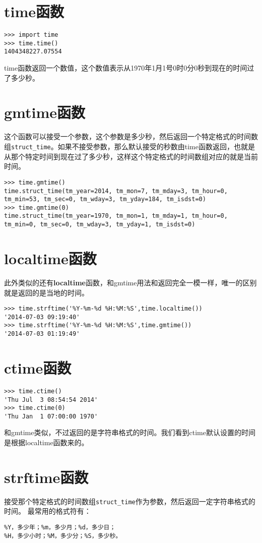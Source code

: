 \documentclass[12pt,oneside]{book}
\begin{document}
\begin{common-format}
\section{time函数}
\begin{Verbatim}
>>> import time
>>> time.time()
1404348227.07554
\end{Verbatim}
time函数返回一个数值，这个数值表示从1970年1月1号0时0分0秒到现在的时间过了多少秒。

\section{gmtime函数}
这个函数可以接受一个参数，这个参数是多少秒，然后返回一个特定格式的时间数组\verb+struct_time+。如果不接受参数，那么默认接受的秒数由time函数返回，也就是从那个特定时间到现在过了多少秒，这样这个特定格式的时间数组对应的就是当前时间。

\begin{Verbatim}
>>> time.gmtime()
time.struct_time(tm_year=2014, tm_mon=7, tm_mday=3, tm_hour=0, 
tm_min=53, tm_sec=0, tm_wday=3, tm_yday=184, tm_isdst=0)
>>> time.gmtime(0)
time.struct_time(tm_year=1970, tm_mon=1, tm_mday=1, tm_hour=0, 
tm_min=0, tm_sec=0, tm_wday=3, tm_yday=1, tm_isdst=0)
\end{Verbatim}

\section{localtime函数}
此外类似的还有\textbf{localtime}函数，和gmtime用法和返回完全一模一样，唯一的区别就是返回的是当地的时间。
\begin{Verbatim}
>>> time.strftime('%Y-%m-%d %H:%M:%S',time.localtime())
'2014-07-03 09:19:40'
>>> time.strftime('%Y-%m-%d %H:%M:%S',time.gmtime())
'2014-07-03 01:19:49'
\end{Verbatim}


\section{ctime函数}
\begin{Verbatim}
>>> time.ctime()
'Thu Jul  3 08:54:54 2014'
>>> time.ctime(0)
'Thu Jan  1 07:00:00 1970'
\end{Verbatim}
和gmtime类似，不过返回的是字符串格式的时间。我们看到ctime默认设置的时间是根据localtime函数来的。


\section{strftime函数}
接受那个特定格式的时间数组\verb+struct_time+作为参数，然后返回一定字符串格式的时间。
最常用的格式符有：
\begin{Verbatim}
%Y，多少年；%m，多少月；%d，多少日；
%H，多少小时；%M，多少分；%S，多少秒。
\end{Verbatim}


\end{common-format}
\end{document}
